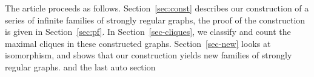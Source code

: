 \documentclass[12pt]{article}
\newcommand\E{{\cal E}}
\renewcommand{\P}{\mathcal P}
\renewcommand{\H}{\mathcal H}
\newcommand\red[1]{{\color{red} #1}}
\newcommand\blue[1]{{\color{blue} #1}}
\begin{document}
%
%

%
%
%
%

The article proceeds as follows. Section~\ref{sec:const} describes our construction of a series of infinite families of strongly regular graphs, the proof of the construction is given in  Section~\ref{sec:pf}. In Section~\ref{sec-cliques}, we classify and count the maximal cliques in these constructed graphs. Section~\ref{sec-new} looks at isomorphism, and shows that our construction yields new families of strongly regular graphs. \red{and the last auto section}
\end{document}
